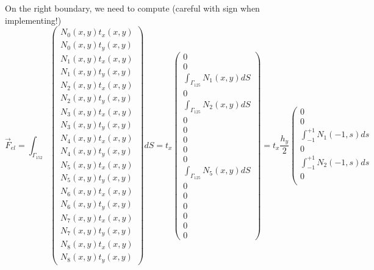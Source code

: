 On the right boundary, we need to compute (careful with sign when implementing!)
\[
\vec{F}_{el}=
\int_{\Gamma_{152}} 
\left(
\begin{array}{c}
N_0(x,y) t_x(x,y)\\
N_0(x,y) t_y(x,y)\\
N_1(x,y) t_x(x,y)\\
N_1(x,y) t_y(x,y)\\
N_2(x,y) t_x(x,y)\\
N_2(x,y) t_y(x,y)\\
N_3(x,y) t_x(x,y)\\
N_3(x,y) t_y(x,y)\\
N_4(x,y) t_x(x,y)\\
N_4(x,y) t_y(x,y)\\
N_5(x,y) t_x(x,y)\\
N_5(x,y) t_y(x,y)\\
N_6(x,y) t_x(x,y)\\
N_6(x,y) t_y(x,y)\\
N_7(x,y) t_x(x,y)\\
N_7(x,y) t_y(x,y)\\
N_8(x,y) t_x(x,y)\\
N_8(x,y) t_y(x,y)
\end{array}
\right)
dS
=
t_x 
\left(
\begin{array}{c}
0 \\ 0 \\
\int_{\Gamma_{125}} N_1(x,y) dS \\ 0 \\ 
\int_{\Gamma_{125}} N_2(x,y) dS \\ 0 \\
0 \\ 0 \\
0 \\ 0 \\ 
\int_{\Gamma_{125}} N_5(x,y) dS \\
0 \\ 0 \\ 
0 \\ 0 \\ 
0 \\ 0
\end{array}
\right)
=
t_x  \frac{h_y}{2}
\left(
\begin{array}{c}
0 \\ 0 \\
\int_{-1}^{+1} N_1(-1,s) ds \\ 0 \\ 
\int_{-1}^{+1} N_2(-1,s) ds \\ 0 \\

\end{array}\]
